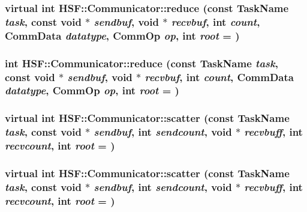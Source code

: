 \label{classHSF_1_1Communicator_a17438ea5cd35f2ae41f48a2abfa1838f}
\hypertarget{classHSF_1_1Communicator_a17438ea5cd35f2ae41f48a2abfa1838f}{
\subsubsection[{reduce}]{\setlength{\rightskip}{0pt plus 5cm}virtual int HSF::Communicator::reduce (const {\bf TaskName} {\em task}, \/  const void $\ast$ {\em sendbuf}, \/  void $\ast$ {\em recvbuf}, \/  int {\em count}, \/  CommData {\em datatype}, \/  CommOp {\em op}, \/  int {\em root} = {})}}
\label{classHSF_1_1Communicator_a17438ea5cd35f2ae41f48a2abfa1838f}
\hypertarget{classHSF_1_1Communicator_a0db2a6f37d9658f57fa2a5c7d2e26950}{
\subsubsection[{reduce}]{\setlength{\rightskip}{0pt plus 5cm}int HSF::Communicator::reduce (const {\bf TaskName} {\em task}, \/  const void $\ast$ {\em sendbuf}, \/  void $\ast$ {\em recvbuf}, \/  int {\em count}, \/  CommData {\em datatype}, \/  CommOp {\em op}, \/  int {\em root} = {})}}
\label{classHSF_1_1Communicator_a0db2a6f37d9658f57fa2a5c7d2e26950}
\hypertarget{classHSF_1_1Communicator_ad7b0160f042fe3574068ca4ffd344fbd}{
\subsubsection[{scatter}]{\setlength{\rightskip}{0pt plus 5cm}virtual int HSF::Communicator::scatter (const {\bf TaskName} {\em task}, \/  const void $\ast$ {\em sendbuf}, \/  int {\em sendcount}, \/  void $\ast$ {\em recvbuff}, \/  int {\em recvcount}, \/  int {\em root} = {})}}
\label{classHSF_1_1Communicator_ad7b0160f042fe3574068ca4ffd344fbd}
\hypertarget{classHSF_1_1Communicator_ad7b0160f042fe3574068ca4ffd344fbd}{
\subsubsection[{scatter}]{\setlength{\rightskip}{0pt plus 5cm}virtual int HSF::Communicator::scatter (const {\bf TaskName} {\em task}, \/  const void $\ast$ {\em sendbuf}, \/  int {\em sendcount}, \/  void $\ast$ {\em recvbuff}, \/  int {\em recvcount}, \/  int {\em root} = {})}}
